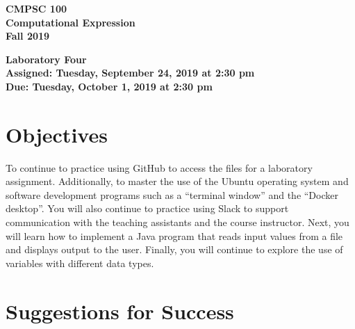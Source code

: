 \documentclass[11pt]{article}
\newcommand{\assignmentduedate}{October 1}
\newcommand{\assignmentassignedate}{September 24}
\newcommand{\assignmentnumber}{Four}
\newcommand{\labyear}{2019}
\newcommand{\labday}{Tuesday}
\newcommand{\labtime}{2:30 pm}
\newcommand{\assigneddate}{Assigned: \labday, \assignmentassignedate, \labyear{} at \labtime{}}
\newcommand{\duedate}{Due: \labday, \assignmentduedate, \labyear{} at \labtime{}}
\newcommand{\labtitle}[1]
{
  \begin{center}
    \begin{center}
      \bf
      CMPSC 100\\Computational Expression\\
      Fall 2019\\
      \medskip
    \end{center}
    \bf
    #1
  \end{center}
}
\begin{document}
\thispagestyle{empty}

\labtitle{Laboratory \assignmentnumber{} \\ \assigneddate{} \\ \duedate{}}

\section*{Objectives}

To continue to practice using GitHub to access the files for a laboratory
assignment. Additionally, to master the use of the Ubuntu operating system and
software development programs such as a ``terminal window'' and the ``Docker
desktop''. You will also continue to practice using Slack to support
communication with the teaching assistants and the course instructor. Next, you
will learn how to implement a Java program that reads input values from a file
and displays output to the user. Finally, you will continue to explore the use
of variables with different data types.

\section*{Suggestions for Success}
\end{document}

